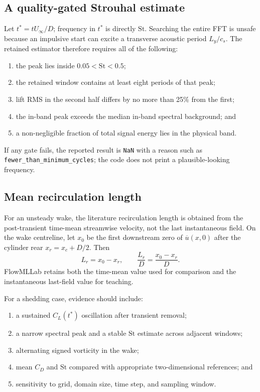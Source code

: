 \documentclass[11pt]{article}
\newcommand{\St}{\mathrm{St}}
\begin{document}
\subsection{A quality-gated Strouhal estimate}
Let $t^*=tU_\infty/D$; frequency in $t^*$ is directly $\St$. Searching the
entire FFT is unsafe because an impulsive start can excite a transverse acoustic
period $L_y/c_s$. The retained estimator therefore requires all of the following:
\begin{enumerate}
\item the peak lies inside $0.05<\St<0.5$;
\item the retained window contains at least eight periods of that peak;
\item lift RMS in the second half differs by no more than 25\% from the first;
\item the in-band peak exceeds the median in-band spectral background; and
\item a non-negligible fraction of total signal energy lies in the physical band.
\end{enumerate}
If any gate fails, the reported result is \texttt{NaN} with a reason such as
\texttt{fewer\_than\_minimum\_cycles}; the code does not print a plausible-looking
frequency.

\subsection{Mean recirculation length}
For an unsteady wake, the literature recirculation length is obtained from the
post-transient time-mean streamwise velocity, not the last instantaneous field.
On the wake centreline, let $x_0$ be the first downstream zero of
$\overline{u}(x,0)$ after the cylinder rear $x_r=x_c+D/2$. Then
\begin{equation}
L_r=x_0-x_r,\qquad \frac{L_r}{D}=\frac{x_0-x_r}{D}.
\end{equation}
FlowMLLab retains both the time-mean value used for comparison and the
instantaneous last-field value for teaching.

For a shedding case, evidence should include:
\begin{enumerate}
\item a sustained $C_L(t^*)$ oscillation after transient removal;
\item a narrow spectral peak and a stable $\St$ estimate across adjacent windows;
\item alternating signed vorticity in the wake;
\item mean $C_D$ and $\St$ compared with appropriate two-dimensional references; and
\item sensitivity to grid, domain size, time step, and sampling window.
\end{enumerate}
\end{document}
